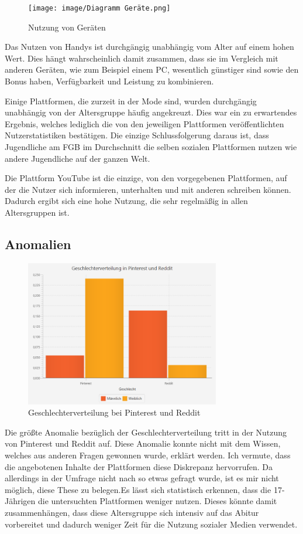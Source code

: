 \begin{figure}[h]
    \centering
    \texttt{[image: image/Diagramm Geräte.png]}
    \caption{\label{imgs:diagramm_geraete_regelmaesigkeit}Nutzung von Geräten}
\end{figure}

Das Nutzen von Handys ist durchgängig unabhängig vom Alter auf einem hohen Wert. Dies hängt wahrscheinlich damit zusammen, dass sie im Vergleich mit anderen Geräten, wie zum Beispiel einem PC, wesentlich günstiger sind sowie den Bonus haben, Verfügbarkeit und Leistung zu kombinieren.

Einige Plattformen, die zurzeit in der Mode sind, wurden durchgängig unabhängig von der Altersgruppe häufig angekreuzt. Dies war ein zu erwartendes Ergebnis, welches lediglich die von den jeweiligen  Plattformen veröffentlichten Nutzerstatistiken bestätigen. Die einzige Schlussfolgerung daraus ist, dass Jugendliche am FGB im Durchschnitt die selben sozialen Plattformen nutzen wie andere Jugendliche auf der ganzen Welt.

Die Plattform YouTube ist die einzige, von den vorgegebenen Plattformen, auf der die Nutzer sich informieren, unterhalten und mit anderen schreiben können. Dadurch ergibt sich eine hohe Nutzung, die sehr regelmäßig in allen Altersgruppen ist.

\subsection{Anomalien}

\begin{figure}[h]
    \centering
    \includegraphics[width=8.5cm]{image/Diagramm Pinterst vs Reddit.png}
    \caption{\label{imgs:diagramm_pinterest_reddit}Geschlechterverteilung bei Pinterest und Reddit}
\end{figure}

Die größte Anomalie bezüglich der Geschlechterverteilung tritt in der Nutzung von Pinterest und Reddit auf. Diese Anomalie konnte nicht mit dem Wissen, welches aus anderen Fragen gewonnen wurde, erklärt werden. Ich vermute, dass die angebotenen Inhalte der Plattformen diese Diskrepanz hervorrufen. Da allerdings in der Umfrage nicht nach so etwas gefragt wurde, ist es mir nicht möglich, diese These zu belegen.Es lässt sich statistisch erkennen, dass die 17-Jährigen die untersuchten Plattformen weniger nutzen. Dieses könnte damit zusammenhängen, dass diese Altersgruppe sich intensiv auf das Abitur vorbereitet und dadurch weniger Zeit für die Nutzung sozialer Medien verwendet.

